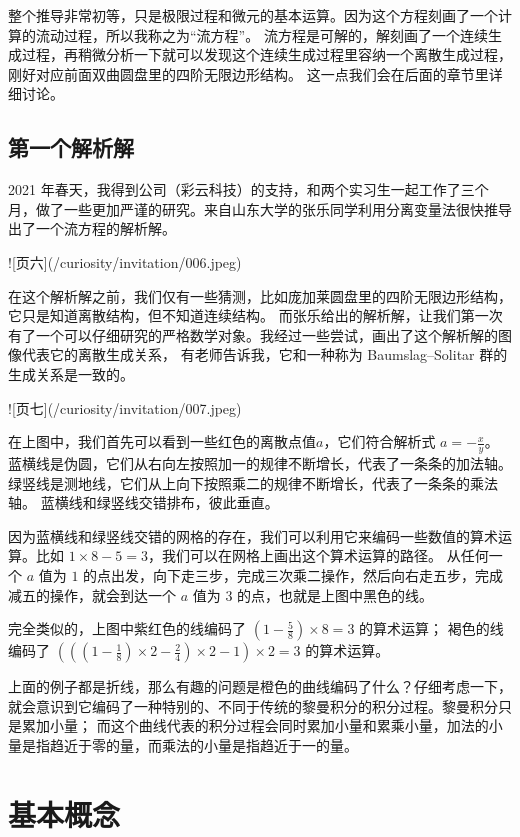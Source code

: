 \documentclass[a4paper,12pt]{book}
\numberwithin{problem}{section}
\numberwithin{definition}{section}
\numberwithin{lemma}{section}
\numberwithin{proposition}{section}
\numberwithin{theorem}{section}
\numberwithin{grammar}{section}
\numberwithin{program}{section}
\numberwithin{convention}{section}
\numberwithin{corollary}{section}
\begin{document}
整个推导非常初等，只是极限过程和微元的基本运算。因为这个方程刻画了一个计算的流动过程，所以我称之为“流方程”。
流方程是可解的，解刻画了一个连续生成过程，再稍微分析一下就可以发现这个连续生成过程里容纳一个离散生成过程，刚好对应前面双曲圆盘里的四阶无限边形结构。
这一点我们会在后面的章节里详细讨论。

\section{第一个解析解}

2021 年春天，我得到公司（彩云科技）的支持，和两个实习生一起工作了三个月，做了一些更加严谨的研究。来自山东大学的张乐同学利用分离变量法很快推导出了一个流方程的解析解。

![页六](/curiosity/invitation/006.jpeg)

在这个解析解之前，我们仅有一些猜测，比如庞加莱圆盘里的四阶无限边形结构，它只是知道离散结构，但不知道连续结构。
而张乐给出的解析解，让我们第一次有了一个可以仔细研究的严格数学对象。我经过一些尝试，画出了这个解析解的图像代表它的离散生成关系，
有老师告诉我，它和一种称为 Baumslag–Solitar 群的生成关系是一致的。

![页七](/curiosity/invitation/007.jpeg)

在上图中，我们首先可以看到一些红色的离散点值$a$，它们符合解析式 $a = -\frac{x}{y}$。
蓝横线是伪圆，它们从右向左按照加一的规律不断增长，代表了一条条的加法轴。 绿竖线是测地线，它们从上向下按照乘二的规律不断增长，代表了一条条的乘法轴。
蓝横线和绿竖线交错排布，彼此垂直。

因为蓝横线和绿竖线交错的网格的存在，我们可以利用它来编码一些数值的算术运算。比如 $1 \times 8 - 5 = 3$，我们可以在网格上画出这个算术运算的路径。
从任何一个 $a$ 值为 $1$ 的点出发，向下走三步，完成三次乘二操作，然后向右走五步，完成减五的操作，就会到达一个 $a$ 值为 $3$ 的点，也就是上图中黑色的线。

完全类似的，上图中紫红色的线编码了 $(1 - \frac{5}{8}) \times 8 = 3$ 的算术运算；
褐色的线编码了 $(((1 - \frac{1}{8}) \times 2 - \frac{2}{4}) \times 2 - 1) \times 2 = 3$ 的算术运算。

上面的例子都是折线，那么有趣的问题是橙色的曲线编码了什么？仔细考虑一下，就会意识到它编码了一种特别的、不同于传统的黎曼积分的积分过程。黎曼积分只是累加小量；
而这个曲线代表的积分过程会同时累加小量和累乘小量，加法的小量是指趋近于零的量，而乘法的小量是指趋近于一的量。

\newpage

\chapter{基本概念}
\end{document}
